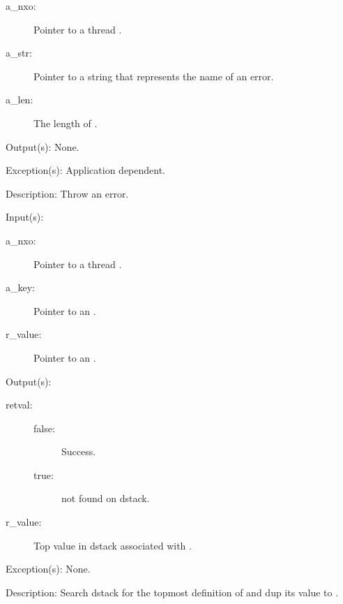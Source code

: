 \begin{capi}
\begin{capilist}
		\begin{description}\item[]
		\item[a\_nxo: ]
			Pointer to a thread .
		\item[a\_str: ]
			Pointer to a string that represents the name of an
			error.
		\item[a\_len: ]
			The length of .
		\end{description}
	\item[Output(s): ] None.
	\item[Exception(s): ] Application dependent.
	\item[Description: ]
		Throw an error.
	\end{capilist}
\label{nxo_thread_dstack_search}
	\begin{capilist}
	\item[Input(s): ]
		\begin{description}\item[]
		\item[a\_nxo: ]
			Pointer to a thread .
		\item[a\_key: ]
			Pointer to an .
		\item[r\_value: ]
			Pointer to an .
		\end{description}
	\item[Output(s): ]
		\begin{description}\item[]
		\item[retval: ]
			\begin{description}\item[]
			\item[false: ]
				Success.
			\item[true: ]
				 not found on dstack.
			\end{description}
		\item[r\_value: ]
			Top value in dstack associated with .
		\end{description}
	\item[Exception(s): ] None.
	\item[Description: ]
		Search dstack for the topmost definition of  and
		dup its value to .
	\end{capilist}
\label{nxo_thread_class_hier_search}

\end{capi}
